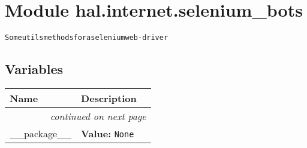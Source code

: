 %
%
%


\section{Module hal.internet.selenium\_bots}

    \label{hal:internet:selenium_bots}
\begin{alltt}
Some utils methods for a selenium web-driver 
\end{alltt}



  \subsection{Variables}

    \vspace{-1cm}
\hspace{\varindent}\begin{longtable}{|p{\varnamewidth}|p{\vardescrwidth}|l}
\cline{1-2}
\cline{1-2} \centering \textbf{Name} & \centering \textbf{Description}& \\
\cline{1-2}
\endhead\cline{1-2}\multicolumn{3}{r}{\small\textit{continued on next page}}\\\endfoot\cline{1-2}
\endlastfoot\raggedright \_\-\_\-p\-a\-c\-k\-a\-g\-e\-\_\-\_\- & \raggedright \textbf{Value:} 
{\tt None}&\\
\cline{1-2}
\end{longtable}



